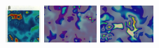 \begin{itemize}
\includegraphics[height=1.4cm]{python_codes/fieldstone_171/images/pear93_beta}
\includegraphics[height=1.4cm]{python_codes/fieldstone_171/images/munafo_beta1}
\includegraphics[height=1.4cm]{python_codes/fieldstone_171/images/munafo_beta2}


\end{itemize}
